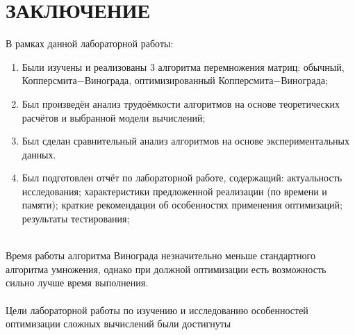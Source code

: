 \chapter*{ЗАКЛЮЧЕНИЕ}

В рамках данной лабораторной работы:

\begin{enumerate}
    \item Были изучены и реализованы 3 алгоритма перемножения матриц: обычный, Копперсмита$-$Винограда, оптимизированный Копперсмита$-$Винограда;
    \item Был произведён анализ трудоёмкости алгоритмов на основе теоретических расчётов и выбранной модели вычислений;
    \item Был сделан сравнительный анализ алгоритмов на основе экспериментальных данных.
    \item Был подготовлен отчёт по лабораторной работе, содержащий: актуальность исследования; характеристики предложенной реализации (по времени и памяти);
    краткие рекомендации об особенностях применения оптимизаций;
    результаты тестирования;
\end{enumerate}
\\
Время работы алгоритма Винограда незначительно меньше стандартного алгоритма умножения, однако при должной оптимизации есть возможность сильно лучше время выполнения.
\\
\\
Цели лабораторной работы по изучению и исследованию особенностей оптимизации сложных вычислений были достигнуты